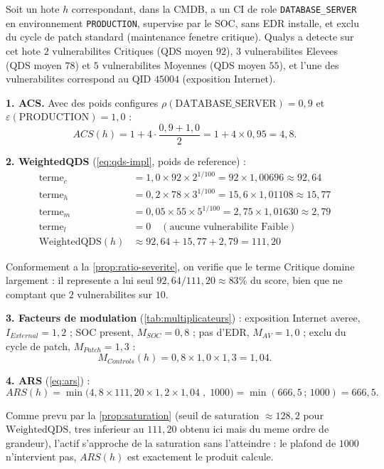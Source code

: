 \begin{exemple}
\label{ex:calcul-complet}
Soit un hote $h$ correspondant, dans la CMDB, a un CI de role
\texttt{DATABASE\_SERVER} en environnement \texttt{PRODUCTION}, supervise par le SOC,
sans EDR installe, et exclu du cycle de patch standard (maintenance fenetre
critique). Qualys a detecte sur cet hote $2$ vulnerabilites Critiques (QDS moyen
$92$), $3$ vulnerabilites Elevees (QDS moyen $78$) et $5$ vulnerabilites Moyennes
(QDS moyen $55$), et l'une des vulnerabilites correspond au QID $45004$ (exposition
Internet).

\smallskip
\noindent\textbf{1. ACS.} Avec des poids configures $\rho(\text{DATABASE\_SERVER})=0{,}9$
et $\varepsilon(\text{PRODUCTION})=1{,}0$ :
\[
ACS(h) = 1+4\cdot\frac{0{,}9+1{,}0}{2} = 1+4\times0{,}95 = 4{,}8 .
\]

\smallskip
\noindent\textbf{2. WeightedQDS} (\cref{eq:qds-impl}, poids de reference) :
\[
\begin{aligned}
\text{terme}_c &= 1{,}0 \times 92 \times 2^{1/100} = 92 \times 1{,}00696 \approx 92{,}64 \\
\text{terme}_h &= 0{,}2 \times 78 \times 3^{1/100} = 15{,}6 \times 1{,}01108 \approx 15{,}77 \\
\text{terme}_m &= 0{,}05 \times 55 \times 5^{1/100} = 2{,}75 \times 1{,}01630 \approx 2{,}79 \\
\text{terme}_l &= 0 \quad (\text{aucune vulnerabilite Faible}) \\
\mathrm{WeightedQDS}(h) &\approx 92{,}64+15{,}77+2{,}79 = 111{,}20
\end{aligned}
\]

\noindent Conformement a la \cref{prop:ratio-severite}, on verifie que le terme
Critique domine largement : il represente a lui seul
$92{,}64/111{,}20\approx 83\%$ du score, bien que ne comptant que $2$
vulnerabilites sur $10$.

\smallskip
\noindent\textbf{3. Facteurs de modulation} (\cref{tab:multiplicateurs}) : exposition
Internet averee, $I_{External}=1{,}2$ ; SOC present, $M_{SOC}=0{,}8$ ; pas d'EDR,
$M_{AV}=1{,}0$ ; exclu du cycle de patch, $M_{Patch}=1{,}3$ :
\[
M_{Controls}(h) = 0{,}8\times1{,}0\times1{,}3 = 1{,}04 .
\]

\smallskip
\noindent\textbf{4. ARS} (\cref{eq:ars}) :
\[
ARS(h) = \min\big(4{,}8 \times 111{,}20 \times 1{,}2 \times 1{,}04\;,\;1000\big)
= \min(666{,}5\,;\,1000) = 666{,}5 .
\]

\noindent Comme prevu par la \cref{prop:saturation} (seuil de saturation
$\approx128{,}2$ pour $\mathrm{WeightedQDS}$, tres inferieur au $111{,}20$ obtenu
ici mais du meme ordre de grandeur), l'actif s'approche de la saturation sans
l'atteindre : le plafond de $1000$ n'intervient pas, $ARS(h)$ est exactement le
produit calcule.


\end{exemple}
